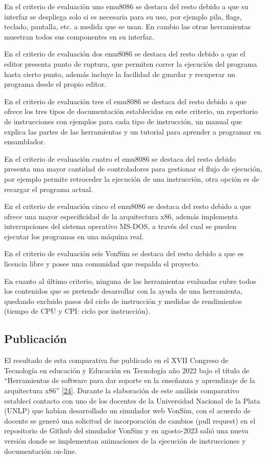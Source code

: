 \documentclass[12pt,twoside]{templates/unerthesis}
\begin{document}
En el criterio de evaluación uno emu8086 se destaca del resto debido a que su interfaz se despliega solo si es necesaria para su uso, por ejemplo pila, flags, teclado, pantalla, etc. a medida que se usan. En cambio las otras herramientas muestran todos sus componentes en su interfaz.

En el criterio de evaluación dos emu8086 se destaca del resto debido a que el editor presenta punto de ruptura, que permiten correr la ejecución del programa hasta cierto punto, además incluye la facilidad de guardar y recuperar un programa desde el propio editor.

En el criterio de evaluación tres el emu8086 se destaca del resto debido a que ofrece los tres tipos de documentación establecidas en este criterio, un repertorio de instrucciones con ejemplos para cada tipo de instrucción, un manual que explica las partes de las herramientas y un tutorial para aprender a programar en ensamblador.

En el criterio de evaluación cuatro el emu8086 se destaca del resto debido presenta una mayor cantidad de controladores para gestionar el flujo de ejecución, por ejemplo permite retroceder la ejecución de una instrucción, otra opción es de recargar el programa actual.

En el criterio de evaluación cinco el emu8086 se destaca del resto debido a que ofrece una mayor especificidad de la arquitectura x86, además implementa interrupciones del sistema operativo MS-DOS, a través del cual se pueden ejecutar los programas en una máquina real.

En el criterio de evaluación seis VonSim se destaca del resto debido a que es licencia libre y posee una comunidad que respalda el proyecto.

En cuanto al último criterio, ninguna de las herramientas evaluadas cubre todos los contenidos que se pretende desarrollar con la ayuda de una herramienta, quedando excluido pasos del ciclo de instrucción y medidas de rendimientos (tiempo de CPU y CPI: ciclo por instrucción).

\hypertarget{publicaciuxf3n}{%
\subsection{Publicación}\label{publicaciuxf3n}}

El resultado de esta comparativa fue publicado en el XVII Congreso de Tecnología en educación y Educación en Tecnología año 2022 bajo el título de ``Herramientas de software para dar soporte en la enseñanza y aprendizaje de la arquitectura x86'' {[}\protect\hyperlink{ref-colombani_herramientas_2022}{24}{]}.
Durante la elaboración de este análisis comparativo establecí contacto con uno de los docentes de la Universidad Nacional de la Plata (UNLP) que habían desarrollado un simulador web VonSim, con el acuerdo de docente se generó una solicitud de incorporación de cambios (pull request) en el repositorio de Github del simulador VonSim y en agosto-2023 salió una nueva versión donde se implementan animaciones de la ejecución de instrucciones y documentación on-line.
\end{document}
